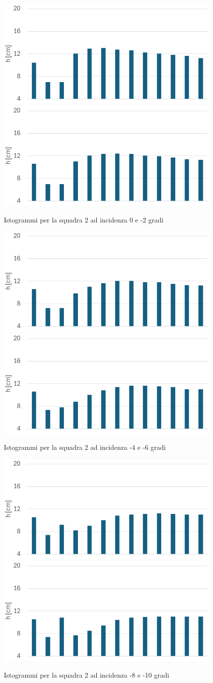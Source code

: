 \begin{figure}[H]
    \centering
    \includegraphics[width=.49\textwidth]{images/5/dsq2a0.png}
    \includegraphics[width=.49\textwidth]{images/5/dsq2a-2.png}
    \caption{Istogrammi per la squadra 2 ad incidenza 0 e -2 gradi}
\end{figure}

\begin{figure}[H]
    \centering
    \includegraphics[width=.49\textwidth]{images/5/dsq2a-4.png}
    \includegraphics[width=.49\textwidth]{images/5/dsq2a-6.png}
    \caption{Istogrammi per la squadra 2 ad incidenza -4 e -6 gradi}
\end{figure}

\begin{figure}[H]
    \centering
    \includegraphics[width=.49\textwidth]{images/5/dsq2a-8.png}
    \includegraphics[width=.49\textwidth]{images/5/dsq2a-10.png}
    \caption{Istogrammi per la squadra 2 ad incidenza -8 e -10 gradi}
\end{figure}

